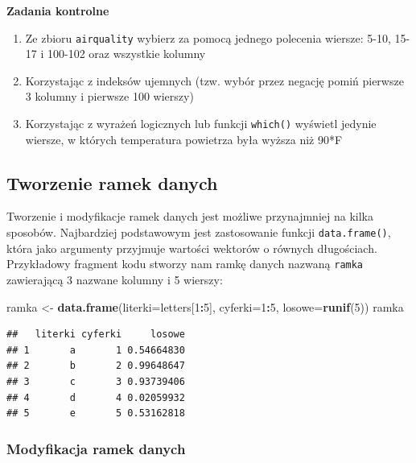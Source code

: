 \documentclass[]{book}
\newenvironment{Shaded}{\begin{snugshade}}{\end{snugshade}}
\newcommand{\KeywordTok}[1]{\textcolor[rgb]{0.13,0.29,0.53}{\textbf{#1}}}
\newcommand{\DataTypeTok}[1]{\textcolor[rgb]{0.13,0.29,0.53}{#1}}
\newcommand{\DecValTok}[1]{\textcolor[rgb]{0.00,0.00,0.81}{#1}}
\newcommand{\StringTok}[1]{\textcolor[rgb]{0.31,0.60,0.02}{#1}}
\newcommand{\OperatorTok}[1]{\textcolor[rgb]{0.81,0.36,0.00}{\textbf{#1}}}
\newcommand{\NormalTok}[1]{#1}
\theoremstyle{definition}
\theoremstyle{definition}
\theoremstyle{definition}
\theoremstyle{remark}
\begin{document}
\textbf{Zadania kontrolne}

\begin{enumerate}
\def\labelenumi{\arabic{enumi}.}
\item
  Ze zbioru \texttt{airquality} wybierz za pomocą jednego polecenia
  wiersze: 5-10, 15-17 i 100-102 oraz wszystkie kolumny
\item
  Korzystając z indeksów ujemnych (tzw. wybór przez negację pomiń
  pierwsze 3 kolumny i pierwsze 100 wierszy)
\item
  Korzystając z wyrażeń logicznych lub funkcji \texttt{which()} wyświetl
  jedynie wiersze, w których temperatura powietrza była wyższa niż 90*F
\end{enumerate}

\subsection{Tworzenie ramek danych}\label{tworzenie-ramek-danych}

Tworzenie i modyfikacje ramek danych jest możliwe przynajmniej na kilka
sposobów. Najbardziej podstawowym jest zastosowanie funkcji
\texttt{data.frame()}, która jako argumenty przyjmuje wartości wektorów
o równych długościach. Przykładowy fragment kodu stworzy nam ramkę
danych nazwaną \texttt{ramka} zawierającą 3 nazwane kolumny i 5 wierszy:

\begin{Shaded}
\begin{Highlighting}[]
\NormalTok{ramka <-}\StringTok{ }\KeywordTok{data.frame}\NormalTok{(}\DataTypeTok{literki=}\NormalTok{letters[}\DecValTok{1}\OperatorTok{:}\DecValTok{5}\NormalTok{], }\DataTypeTok{cyferki=}\DecValTok{1}\OperatorTok{:}\DecValTok{5}\NormalTok{, }\DataTypeTok{losowe=}\KeywordTok{runif}\NormalTok{(}\DecValTok{5}\NormalTok{))}
\NormalTok{ramka}
\end{Highlighting}
\end{Shaded}

\begin{verbatim}
##   literki cyferki     losowe
## 1       a       1 0.54664830
## 2       b       2 0.99648647
## 3       c       3 0.93739406
## 4       d       4 0.02059932
## 5       e       5 0.53162818
\end{verbatim}

\subsubsection{Modyfikacja ramek danych}\label{modyfikacja-ramek-danych}
\end{document}
